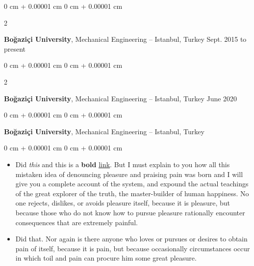 \documentclass[10pt, letterpaper]{article}
\newenvironment{highlights}{
    \begin{itemize}[
        topsep=0.10 cm,
        parsep=0.10 cm,
        partopsep=0pt,
        itemsep=0pt,
        leftmargin=0 cm + 10pt
    ]
}{
    \end{itemize}
} %
\newenvironment{onecolentry}{
    \begin{adjustwidth}{
        0 cm + 0.00001 cm
    }{
        0 cm + 0.00001 cm
    }
}{
    \end{adjustwidth}
} %
\newenvironment{twocolentry}[2][]{
    \onecolentry
    \def\secondColumn{#2}
    \setcolumnwidth{\fill, 4.5 cm}
    \begin{paracol}{2}
}{
    \switchcolumn \raggedleft \secondColumn
    \end{paracol}
    \endonecolentry
} %
\begin{document}
        \vspace{0.2 cm}

        \begin{twocolentry}{
            Sept. 2015 to present
        }
            \textbf{Boğaziçi University}, Mechanical Engineering -- Istanbul, Turkey\end{twocolentry}



        \vspace{0.2 cm}

        \begin{twocolentry}{
            June 2020
        }
            \textbf{Boğaziçi University}, Mechanical Engineering -- Istanbul, Turkey\end{twocolentry}



        \vspace{0.2 cm}

        \begin{onecolentry}
            \textbf{Boğaziçi University}, Mechanical Engineering -- Istanbul, Turkey\end{onecolentry}

        \vspace{0.10 cm}
        \begin{onecolentry}
            \begin{highlights}
                \item Did \textit{this} and this is a \textbf{bold} \href{https://example.com}{link}. But I must explain to you how all this mistaken idea of denouncing pleasure and praising pain was born and I will give you a complete account of the system, and expound the actual teachings of the great explorer of the truth, the master-builder of human happiness. No one rejects, dislikes, or avoids pleasure itself, because it is pleasure, but because those who do not know how to pursue pleasure rationally encounter consequences that are extremely painful.
                \item Did that. Nor again is there anyone who loves or pursues or desires to obtain pain of itself, because it is pain, but because occasionally circumstances occur in which toil and pain can procure him some great pleasure.
            \end{highlights}
        \end{onecolentry}


        \vspace{0.2 cm}
\end{document}
